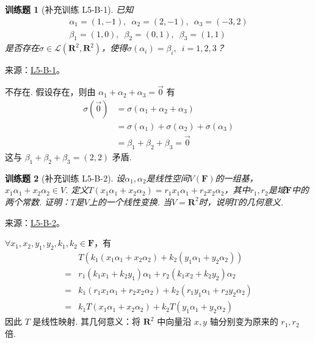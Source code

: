 \documentclass[UTF8,12pt,a4paper,fontset=fandol]{ctexart}
\newtheorem{exercise}{训练题}[section]
\begin{document}
\begin{exercise}[补充训练 L5-B-1]\label{prob:L5-B-1}
已知
        \begin{gather*}
            \alpha_1=(1,-1),\enspace\alpha_2=(2,-1),\enspace\alpha_3=(-3,2) \\
            \beta_1=(1,0),\enspace\beta_2=(0,1),\enspace\beta_3=(1,1)
        \end{gather*}
        是否存在$\sigma\in \mathcal{L}(\mathbf{R}^2,\mathbf{R}^2)$，使得$\sigma(\alpha_i)=\beta_i,\enspace i=1,2,3$？
\end{exercise}
\noindent 来源：\href{https://github.com/yhwu-is/Linear-Algebra-Left-Undone/blob/new/%E8%AE%B2%E4%B9%89/%E4%B8%93%E9%A2%98/5%20%E7%BA%BF%E6%80%A7%E6%98%A0%E5%B0%84.tex}{L5-B-1}。
\begin{solve}
不存在. 假设存在，则由 $ \alpha_1 + \alpha_2 + \alpha_3 = \vec{0} $ 有
          \begin{align*}
              \sigma(\vec{0}) & = \sigma(\alpha_1 + \alpha_2 + \alpha_3)                 \\
                              & = \sigma(\alpha_1) + \sigma(\alpha_2) + \sigma(\alpha_3) \\
                              & = \beta_1 + \beta_2 + \beta_3 = \vec{0}
          \end{align*}
          这与 $ \beta_1 + \beta_2 + \beta_3 = (2, 2) $ 矛盾.
\end{solve}

\begin{exercise}[补充训练 L5-B-2]\label{prob:L5-B-2}
设$\alpha_1,\alpha_2$是线性空间$V(\mathbf{F})$的一组基，$x_1\alpha_1+x_2\alpha_2 \in V$. 定义$T(x_1\alpha_1+x_2\alpha_2)=r_1x_1\alpha_1+r_2x_2\alpha_2$，其中$r_1,r_2$是域$\mathbf{F}$中的两个常数. 证明：$T$是$V$上的一个线性变换. 当$V=\mathbf{R}^2$时，说明$T$的几何意义.
\end{exercise}
\noindent 来源：\href{https://github.com/yhwu-is/Linear-Algebra-Left-Undone/blob/new/%E8%AE%B2%E4%B9%89/%E4%B8%93%E9%A2%98/5%20%E7%BA%BF%E6%80%A7%E6%98%A0%E5%B0%84.tex}{L5-B-2}。
\begin{solve}
$ \forall x_1, x_2, y_1, y_2, k_1, k_2 \in \mathbf{F} $，有
          \begin{align*}
                  & T(k_1(x_1 \alpha_1 + x_2 \alpha_2) + k_2(y_1 \alpha_1 + y_2 \alpha_2))                \\
              ={} & r_1(k_1 x_1 + k_2 y_1) \alpha_1 + r_2(k_1 x_2 + k_2 y_2) \alpha_2                     \\
              ={} & k_1 (r_1 x_1 \alpha_1 + r_2 x_2 \alpha_2) + k_2 (r_1 y_1 \alpha_1 + r_2 y_2 \alpha_2) \\
              ={} & k_1 T(x_1 \alpha_1 + x_2 \alpha_2) + k_2 T(y_1 \alpha_1 + y_2 \alpha_2)
          \end{align*}
          因此 $ T $ 是线性映射. 其几何意义：将 $ \mathbf{R}^2 $ 中向量沿 $ x, y $ 轴分别变为原来的 $ r_1, r_2 $ 倍.
\end{solve}
\end{document}

